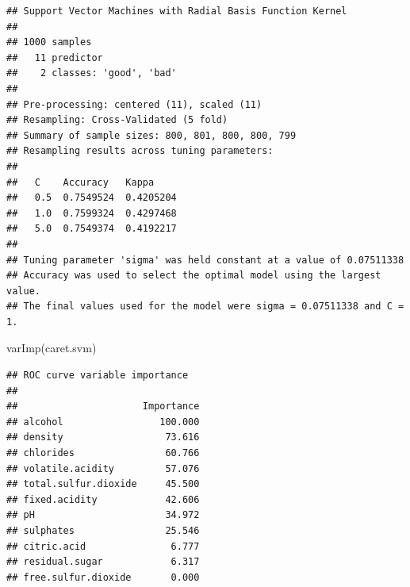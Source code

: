 \documentclass[
  spanish,
]{book}
\newenvironment{Shaded}{\begin{snugshade}}{\end{snugshade}}
\newcommand{\AttributeTok}[1]{\textcolor[rgb]{0.77,0.63,0.00}{#1}}
\newcommand{\FunctionTok}[1]{\textcolor[rgb]{0.00,0.00,0.00}{#1}}
\newcommand{\NormalTok}[1]{#1}
\newcommand{\SpecialCharTok}[1]{\textcolor[rgb]{0.00,0.00,0.00}{#1}}
\theoremstyle{break}
\theoremstyle{definition}
\theoremstyle{definition}
\theoremstyle{definition}
\theoremstyle{definition}
\theoremstyle{remark}
\begin{document}
\begin{verbatim}
## Support Vector Machines with Radial Basis Function Kernel 
## 
## 1000 samples
##   11 predictor
##    2 classes: 'good', 'bad' 
## 
## Pre-processing: centered (11), scaled (11) 
## Resampling: Cross-Validated (5 fold) 
## Summary of sample sizes: 800, 801, 800, 800, 799 
## Resampling results across tuning parameters:
## 
##   C    Accuracy   Kappa    
##   0.5  0.7549524  0.4205204
##   1.0  0.7599324  0.4297468
##   5.0  0.7549374  0.4192217
## 
## Tuning parameter 'sigma' was held constant at a value of 0.07511338
## Accuracy was used to select the optimal model using the largest value.
## The final values used for the model were sigma = 0.07511338 and C = 1.
\end{verbatim}

\begin{Shaded}
\begin{Highlighting}[]
\FunctionTok{varImp}\NormalTok{(caret.svm)}
\end{Highlighting}
\end{Shaded}

\begin{verbatim}
## ROC curve variable importance
## 
##                      Importance
## alcohol                 100.000
## density                  73.616
## chlorides                60.766
## volatile.acidity         57.076
## total.sulfur.dioxide     45.500
## fixed.acidity            42.606
## pH                       34.972
## sulphates                25.546
## citric.acid               6.777
## residual.sugar            6.317
## free.sulfur.dioxide       0.000
\end{verbatim}

\begin{Shaded}
\end{Shaded}
\end{document}
